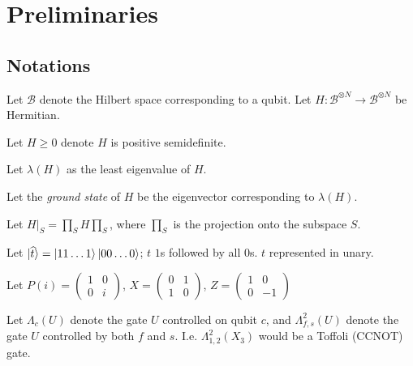 \section{Preliminaries}

\subsection{Notations}

Let $\mathcal{B}$ denote the Hilbert space corresponding to a qubit.
Let $H:\mathcal{B}^{\otimes N}\rightarrow\mathcal{B}^{\otimes N}$ be Hermitian.

\begin{definition}
	Let $H\geq0$ denote $H$ is positive semidefinite.
\end{definition}

\begin{definition}
	Let $\lambda(H)$ as the least eigenvalue of $H$.
\end{definition}

\begin{definition}
	Let the \emph{ground state} of $H$ be the eigenvector corresponding to $\lambda(H)$.
\end{definition}

\begin{definition}
	Let $H\big|_S=\prod_SH\prod_S$, where $\prod_S$ is the projection onto the subspace $S$.
\end{definition}

\begin{definition}
	Let $\ket{\widehat{t}}=\ket{11\ldots1} \ket{00\ldots0}$; $t$ $1$s followed by all $0$s. $t$ represented in unary.
\end{definition}

\begin{definition}
	Let $P(i)=\begin{pmatrix}1&0\\0&i\end{pmatrix}$, $X=\begin{pmatrix}0&1\\1&0\end{pmatrix}$, $Z=\begin{pmatrix}1&0\\0&-1\end{pmatrix}$
\end{definition}

\begin{definition}
	Let $\Lambda_c(U)$ denote the gate $U$ controlled on qubit $c$, and $\Lambda^2_{f, s}(U)$ denote the gate $U$ controlled by both $f$ and $s$. I.e. $\Lambda^2_{1, 2}(X_3)$ would be a Toffoli (CCNOT) gate.
\end{definition}

